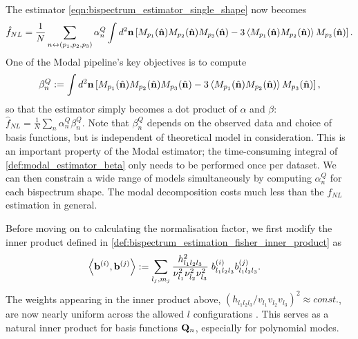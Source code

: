 The estimator \eqref{eqn:bispectrum_estimator_single_shape} now becomes
\begin{align}
	\hat{f}_{NL} = \frac{1}{N} \sum_{n \newline \leftrightarrow (p_1,p_2,p_3)} \alpha_n^Q \int d^2 \vv{n} \left[ M_{p_1}(\hat{\vv{n}}) M_{p_2}(\hat{\vv{n}}) M_{p_3}(\hat{\vv{n}}) - 3 \left< M_{p_1}(\hat{\vv{n}}) M_{p_2}(\hat{\vv{n}}) \right> M_{p_3}(\hat{\vv{n}})  \right].
\end{align}
One of the Modal pipeline's key objectives is to compute
\begin{align}
	\beta^Q_n := \int d^2 \mathbf{n} \left[ M_{p_1}(\hat{\mathbf{n}}) M_{p_2}(\hat{\mathbf{n}}) M_{p_3}(\hat{\mathbf{n}}) - 3 \left< M_{p_1}(\hat{\mathbf{n}}) M_{p_2}(\hat{\mathbf{n}}) \right> M_{p_3}(\hat{\mathbf{n}})  \right], \label{def:modal_estimator_beta}
\end{align}
so that the estimator simply becomes a dot product of $\alpha$ and $\beta$: $\hat{f}_{NL} = \frac{1}{N} \sum_n \alpha^Q_n \beta^Q_n$. Note that $\beta_n^Q$ depends on the observed data and choice of basis functions, but is independent of theoretical model in consideration. This is an important property of the Modal estimator; the time-consuming integral of \eqref{def:modal_estimator_beta} only needs to be performed once per dataset. We can then constrain a wide range of models simultaneously by computing $\alpha^Q_n$ for each bispectrum shape. The modal decomposition costs much less than the $f_{NL}$ estimation in general.

Before moving on to calculating the normalisation factor, we first modify the inner product defined in \eqref{def:bispectrum_estimation_fisher_inner_product} as
\begin{align}
	\left< \mathbf{b}^{(i)}, \mathbf{b}^{(j)} \right> &:= \sum_{l_j,m_j} \frac{h^2_{l_1 l_2 l_3}}{\nu_{l_1}^2 \nu_{l_2}^2 \nu_{l_3}^2 } \; b^{(i)}_{l_1 l_2 l_3} b^{(j)}_{l_1 l_2 l_3}.
\end{align}
The weights appearing in the inner product above, $(h_{l_1 l_2 l_3}/v_{l_1} v_{l_2} v_{l_3})^2\approx const.$, are now nearly uniform across the allowed $l$ configurations \cite{Fergusson2010general}. This serves as a natural inner product for basis functions $\mathbf{Q}_n$, especially for polynomial modes.

